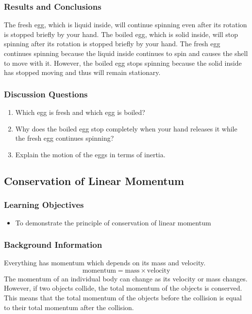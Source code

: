\subsubsection*{Results and Conclusions}
The fresh egg, which is liquid inside, will continue spinning even after its rotation is stopped briefly by your hand. The boiled egg, which is solid inside, will stop spinning after its rotation is stopped briefly by your hand.  
The fresh egg continues spinning because the liquid inside continues to spin and causes the shell to move with it. However, the boiled egg stops spinning because the solid inside has stopped moving and thus will remain stationary.  

\subsubsection*{Discussion Questions}
\begin{enumerate}
\item{Which egg is fresh and which egg is boiled?}
\item{Why does the boiled egg stop completely when your hand releases it while the fresh egg continues spinning?}
\item{Explain the motion of the eggs in terms of inertia.} 
\end{enumerate}
 

\subsection{Conservation of Linear Momentum}

\subsubsection*{Learning Objectives}
\begin{itemize}
\item{To demonstrate the principle of conservation of linear momentum}
\end{itemize}

\subsubsection*{Background Information}
Everything has momentum which depends on its mass and velocity.  
$$\mathrm{momentum} = \mathrm{mass} \times \mathrm{velocity}$$ 
The momentum of an individual body can change as its velocity or mass changes. However, if two objects collide, the total momentum of the objects is conserved.  This means that the total momentum of the objects before the collision is equal to their total momentum after the collision.

